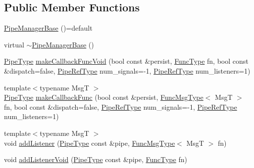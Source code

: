 \subsection*{Public Member Functions}
\begin{DoxyCompactItemize}
\item 
\hyperlink{structvt_1_1pipe_1_1_pipe_manager_base_a6b3b1e6d6bfe21308090d2dc62743961}{Pipe\+Manager\+Base} ()=default
\item 
virtual \hyperlink{structvt_1_1pipe_1_1_pipe_manager_base_af7b66141f69a485c6fce5e02bbbd3f89}{$\sim$\+Pipe\+Manager\+Base} ()
\item 
\hyperlink{namespacevt_ac9852acda74d1896f48f406cd72c7bd3}{Pipe\+Type} \hyperlink{structvt_1_1pipe_1_1_pipe_manager_base_a06e2f38ea4dc340ccc63b0c695df3951}{make\+Callback\+Func\+Void} (bool const \&persist, \hyperlink{structvt_1_1pipe_1_1_pipe_manager_base_a7ddc75a14fa50cd8521641ef6f9ea78d}{Func\+Type} fn, bool const \&dispatch=false, \hyperlink{namespacevt_ace18d74dd489d9ea506d38789fffce34}{Pipe\+Ref\+Type} num\+\_\+signals=-\/1, \hyperlink{namespacevt_ace18d74dd489d9ea506d38789fffce34}{Pipe\+Ref\+Type} num\+\_\+listeners=1)
\item 
{\footnotesize template$<$typename MsgT $>$ }\\\hyperlink{namespacevt_ac9852acda74d1896f48f406cd72c7bd3}{Pipe\+Type} \hyperlink{structvt_1_1pipe_1_1_pipe_manager_base_a57a1c95c5256aabd25c8a3e0bf58f5cc}{make\+Callback\+Func} (bool const \&persist, \hyperlink{structvt_1_1pipe_1_1_pipe_manager_base_aa54eee64ab32a27777a672d49eb861f4}{Func\+Msg\+Type}$<$ MsgT $>$ fn, bool const \&dispatch=false, \hyperlink{namespacevt_ace18d74dd489d9ea506d38789fffce34}{Pipe\+Ref\+Type} num\+\_\+signals=-\/1, \hyperlink{namespacevt_ace18d74dd489d9ea506d38789fffce34}{Pipe\+Ref\+Type} num\+\_\+listeners=1)
\item 
{\footnotesize template$<$typename MsgT $>$ }\\void \hyperlink{structvt_1_1pipe_1_1_pipe_manager_base_aa878aef84540ec6c2ca89096683d407e}{add\+Listener} (\hyperlink{namespacevt_ac9852acda74d1896f48f406cd72c7bd3}{Pipe\+Type} const \&pipe, \hyperlink{structvt_1_1pipe_1_1_pipe_manager_base_aa54eee64ab32a27777a672d49eb861f4}{Func\+Msg\+Type}$<$ MsgT $>$ fn)
\item 
void \hyperlink{structvt_1_1pipe_1_1_pipe_manager_base_ae486f94f76733fd3d97ff393c35d0e5e}{add\+Listener\+Void} (\hyperlink{namespacevt_ac9852acda74d1896f48f406cd72c7bd3}{Pipe\+Type} const \&pipe, \hyperlink{structvt_1_1pipe_1_1_pipe_manager_base_a7ddc75a14fa50cd8521641ef6f9ea78d}{Func\+Type} fn)
\end{DoxyCompactItemize}
